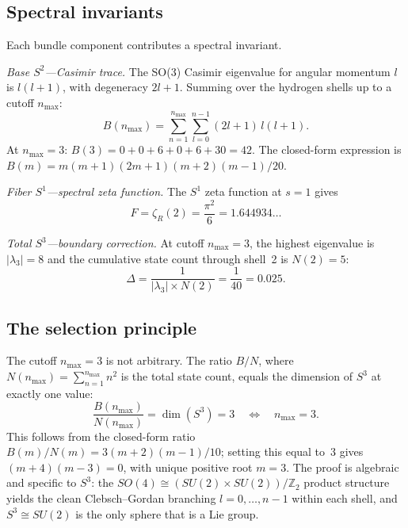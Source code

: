 \documentclass[aps,pra,twocolumn,superscriptaddress,longbibliography]{revtex4-2}
\begin{document}
\subsection{Spectral invariants}

Each bundle component contributes a spectral invariant.

\textit{Base $S^2$---Casimir trace.}  The SO(3) Casimir eigenvalue for
angular momentum $l$ is $l(l+1)$, with degeneracy $2l+1$.  Summing
over the hydrogen shells up to a cutoff $n_{\max}$:
\begin{equation}
B(n_{\max}) = \sum_{n=1}^{n_{\max}} \sum_{l=0}^{n-1}
(2l+1)\, l(l+1).
\label{eq:casimir_trace}
\end{equation}
At $n_{\max} = 3$: $B(3) = 0 + 0 + 6 + 0 + 6 + 30 = 42$.  The
closed-form expression is $B(m) = m(m+1)(2m+1)(m+2)(m-1)/20$.

\textit{Fiber $S^1$---spectral zeta function.}  The $S^1$ zeta function
at $s = 1$ gives
\begin{equation}
F = \zeta_R(2) = \frac{\pi^2}{6} = 1.644934\ldots
\label{eq:fiber_zeta}
\end{equation}

\textit{Total $S^3$---boundary correction.}  At cutoff $n_{\max} = 3$,
the highest eigenvalue is $|\lambda_3| = 8$ and the cumulative state
count through shell~2 is $N(2) = 5$:
\begin{equation}
\Delta = \frac{1}{|\lambda_3| \times N(2)} = \frac{1}{40} = 0.025.
\label{eq:boundary}
\end{equation}

\subsection{The selection principle}

The cutoff $n_{\max} = 3$ is not arbitrary.  The ratio $B/N$, where
$N(n_{\max}) = \sum_{n=1}^{n_{\max}} n^2$ is the total state count,
equals the dimension of $S^3$ at exactly one value:
\begin{equation}
\frac{B(n_{\max})}{N(n_{\max})} = \dim(S^3) = 3
\quad\Leftrightarrow\quad n_{\max} = 3.
\label{eq:selection}
\end{equation}
This follows from the closed-form ratio
$B(m)/N(m) = 3(m+2)(m-1)/10$; setting this equal to~3 gives
$(m+4)(m-3) = 0$, with unique positive root $m = 3$.  The proof is
algebraic and specific to $S^3$: the $SO(4) \cong (SU(2) \times
SU(2))/\mathbb{Z}_2$ product structure yields the clean
Clebsch--Gordan branching $l = 0, \ldots, n-1$ within each shell,
and $S^3 \cong SU(2)$ is the only sphere that is a Lie group.
\end{document}
